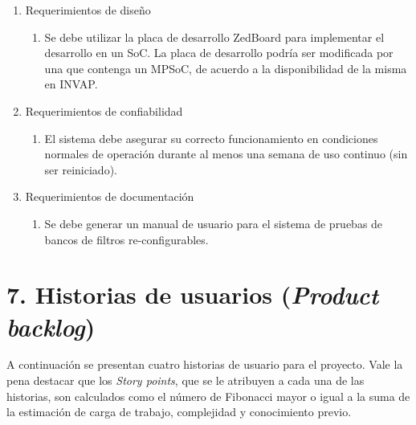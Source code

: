 \documentclass[
11pt, %
]{charter}
\begin{document}
\begin{enumerate}
	\item Requerimientos de diseño
	\begin{enumerate}
		\item Se debe utilizar la placa de desarrollo ZedBoard para implementar el desarrollo en un SoC. La placa de desarrollo podría ser modificada por una que contenga un MPSoC, de acuerdo a la disponibilidad de la misma en INVAP.
	\end{enumerate}

	\item Requerimientos de confiabilidad 
	\begin{enumerate}
		\item El sistema debe asegurar su correcto funcionamiento en condiciones normales de operación durante al menos una semana de uso continuo (sin ser reiniciado).
	\end{enumerate}

	\item Requerimientos de documentación
	\begin{enumerate}
		\item Se debe generar un manual de usuario para el sistema de pruebas de bancos de filtros re-configurables.
	\end{enumerate}
\end{enumerate}

\clearpage

\section{7. Historias de usuarios (\textit{Product backlog})}
\label{sec:backlog}

A continuación se presentan cuatro historias de usuario para el proyecto. Vale la pena destacar que los \emph{Story points}, que se le atribuyen a cada una de las historias, son calculados como el número de Fibonacci mayor o igual a la suma de la estimación de carga de trabajo, complejidad y conocimiento previo.
\end{document}
